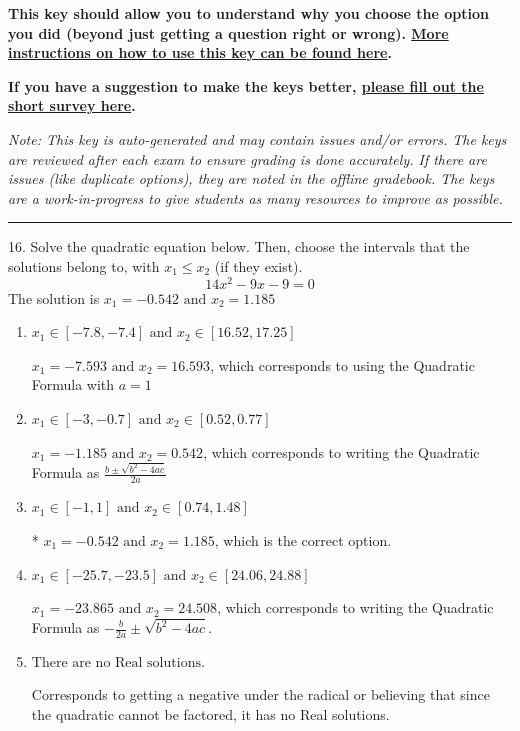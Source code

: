 \documentclass{article}[14pt]
\begin{document}
\textbf{This key should allow you to understand why you choose the option you did (beyond just getting a question right or wrong). \href{https://xronos.clas.ufl.edu/mac1105spring2020/courseDescriptionAndMisc/Exams/LearningFromResults}{More instructions on how to use this key can be found here}.}

\textbf{If you have a suggestion to make the keys better, \href{https://forms.gle/CZkbZmPbC9XALEE88}{please fill out the short survey here}.}

\textit{Note: This key is auto-generated and may contain issues and/or errors. The keys are reviewed after each exam to ensure grading is done accurately. If there are issues (like duplicate options), they are noted in the offline gradebook. The keys are a work-in-progress to give students as many resources to improve as possible.}

\rule{\textwidth}{0.4pt}

16. Solve the quadratic equation below. Then, choose the intervals that the solutions belong to, with $x_1 \leq x_2$ (if they exist).
$$ 14x^{2} -9 x -9 = 0 $$ 
The solution is $ x_1 = -0.542 \text{ and } x_2 = 1.185 $ 

\begin{enumerate}[label=\Alph*.] 
\item $ x_1 \in [-7.8, -7.4] \text{ and } x_2 \in [16.52, 17.25] $ 

  $x_1 = -7.593 \text{ and } x_2 = 16.593$, which corresponds to using the Quadratic Formula with $a=1$ 
\item $ x_1 \in [-3, -0.7] \text{ and } x_2 \in [0.52, 0.77] $ 

  $x_1 = -1.185 \text{ and } x_2 = 0.542$, which corresponds to writing the Quadratic Formula as $\frac{b \pm \sqrt{b^2 - 4ac}}{2a}$ 
\item $ x_1 \in [-1, 1] \text{ and } x_2 \in [0.74, 1.48] $ 

 * $x_1 = -0.542 \text{ and } x_2 = 1.185$, which is the correct option. 
\item $ x_1 \in [-25.7, -23.5] \text{ and } x_2 \in [24.06, 24.88] $ 

  $x_1 = -23.865 \text{ and } x_2 = 24.508$, which corresponds to writing the Quadratic Formula as $-\frac{b}{2a} \pm \sqrt{b^2 - 4ac}$. 
\item $ \text{There are no Real solutions.} $ 

 Corresponds to getting a negative under the radical or believing that since the quadratic cannot be factored, it has no Real solutions. 
\end{enumerate} 
 
\end{document}
